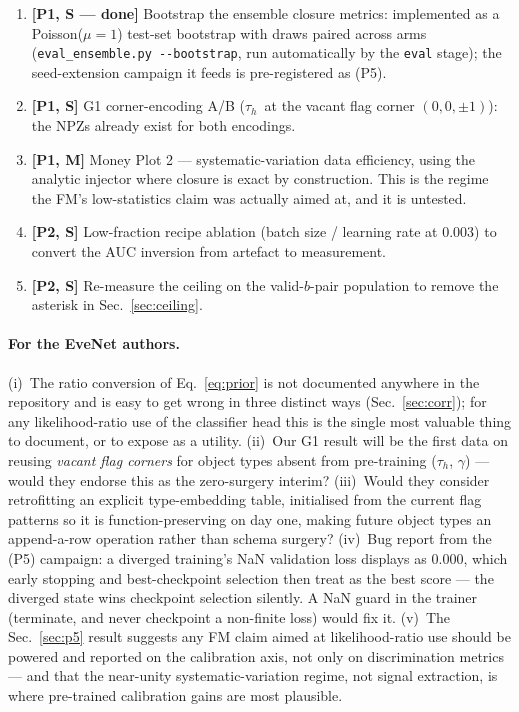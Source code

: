 \documentclass[11pt]{article}
\newcommand{\tauh}{\ensuremath{\tau_h}}
\begin{document}
\begin{enumerate}[label=\textbf{N\arabic*}.,leftmargin=2.6em]
\item \textbf{[P1, S --- done]} Bootstrap the ensemble closure metrics: implemented as a
  Poisson($\mu{=}1$) test-set bootstrap with draws paired across arms
  (\texttt{eval\_ensemble.py -{}-bootstrap}, run automatically by the \texttt{eval}
  stage); the seed-extension campaign it feeds is pre-registered as (P5).
\item \textbf{[P1, S]} G1 corner-encoding A/B (\tauh\ at the vacant flag corner
  $(0,0,\pm1)$): the NPZs already exist for both encodings.
\item \textbf{[P1, M]} Money Plot 2 --- systematic-variation data efficiency, using the
  analytic injector where closure is exact by construction. This is the regime the FM's
  low-statistics claim was actually aimed at, and it is untested.
\item \textbf{[P2, S]} Low-fraction recipe ablation (batch size / learning rate at $0.003$)
  to convert the AUC inversion from artefact to measurement.
\item \textbf{[P2, S]} Re-measure the ceiling on the valid-$b$-pair population to remove the
  asterisk in Sec.~\ref{sec:ceiling}.
\end{enumerate}

\paragraph{For the EveNet authors.} (i)~The ratio conversion of Eq.~\eqref{eq:prior} is not
documented anywhere in the repository and is easy to get wrong in three distinct ways
(Sec.~\ref{sec:corr}); for any likelihood-ratio use of the classifier head this is the
single most valuable thing to document, or to expose as a utility. (ii)~Our G1 result will
be the first data on reusing \emph{vacant flag corners} for object types absent from
pre-training (\tauh, $\gamma$) --- would they endorse this as the zero-surgery interim?
(iii)~Would they consider retrofitting an explicit type-embedding table, initialised from
the current flag patterns so it is function-preserving on day one, making future object
types an append-a-row operation rather than schema surgery?
(iv)~Bug report from the (P5) campaign: a diverged training's NaN validation loss
displays as $0.000$, which early stopping and best-checkpoint selection then treat as
the best score --- the diverged state wins checkpoint selection silently. A NaN guard in
the trainer (terminate, and never checkpoint a non-finite loss) would fix it.
(v)~The Sec.~\ref{sec:p5} result suggests any FM claim aimed at likelihood-ratio use
should be powered and reported on the calibration axis, not only on discrimination
metrics --- and that the near-unity systematic-variation regime, not signal extraction,
is where pre-trained calibration gains are most plausible.
\end{document}
